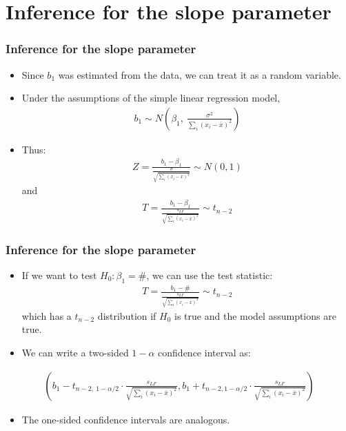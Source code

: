 \documentclass[handout]{beamer}\usepackage[]{graphicx}\usepackage[]{color}
\providecommand{\ov}[1]{\overline{#1}}
\numberwithin{equation}{section}
\begin{document}
\section{Inference for the slope parameter}

\begin{frame}
\frametitle{Inference for the slope parameter}
\begin{itemize}
\item Since $b_1$ was estimated from the data, we can treat it as a random variable.
\pause \item Under the assumptions of the simple linear regression model,
\begin{align*}
b_1 \sim N \left ( \beta_1, \ \frac{\sigma^2}{\sum_i(x_i -\ov{x})^2} \right )
\end{align*}
\pause \item Thus:
\begin{align*}
Z = \frac{b_1 - \beta_1}{\frac{\sigma}{\sqrt{ \sum_i(x_i -\ov{x})^2} }} \sim N(0,1)
\end{align*}
\pause and 
\begin{align*}
T =  \frac{b_1 - \beta_1}{\frac{s_{LF}}{\sqrt{ \sum_i(x_i -\ov{x})^2} }} \sim t_{n-2}
\end{align*}
\end{itemize}
\end{frame}

\begin{frame}
\frametitle{Inference for the slope parameter} \small
\begin{itemize}
\item If we want to test $H_0: \beta_1 = \#$, we can use the test statistic:
\begin{align*}
T = \frac{b_1 - \#}{\frac{s_{LF}}{\sqrt{ \sum_i(x_i -\ov{x})^2} }} \sim t_{n-2}
\end{align*}
\pause which has a $t_{n-2}$ distribution if $H_0$ is true and the model assumptions are true.
\pause \item We can write a two-sided $1 - \alpha$ confidence interval as:
\end{itemize}
\pause \begin{align*}
\left( b_1 - t_{n-2, \ 1 - \alpha/2} \cdot \frac{s_{LF}}{\sqrt{ \sum_i(x_i -\ov{x})^2} }, b_1 + t_{n - 2, 1 - \alpha/2} \cdot \frac{s_{LF}}{\sqrt{ \sum_i(x_i -\ov{x})^2} } \right)
\end{align*}
\begin{itemize}
\pause \item The one-sided confidence intervals are analogous.
\end{itemize}
\end{frame}
\end{document}
